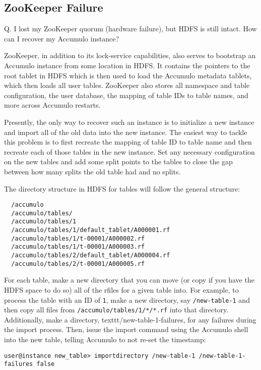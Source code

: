 \subsection{ZooKeeper Failure}
Q. I lost my ZooKeeper quorum (hardware failure), but HDFS is still intact. How can I recover my Accumulo instance?

ZooKeeper, in addition to its lock-service capabilities, also serves to bootstrap an Accumulo
instance from some location in HDFS. It contains the pointers to the root tablet in HDFS which
is then used to load the Accumulo metadata tablets, which then loads all user tables. ZooKeeper
also stores all namespace and table configuration, the user database, the mapping of table IDs to 
table names, and more across Accumulo restarts.

Presently, the only way to recover such an instance is to initialize a new instance and import all
of the old data into the new instance. The easiest way to tackle this problem is to first recreate
the mapping of table ID to table name and then recreate each of those tables in the new instance. 
Set any necessary configuration on the new tables and add some split points to the tables to close 
the gap between how many splits the old table had and no splits.

The directory structure in HDFS for tables will follow the general structure:

\small
\begin{verbatim}
  /accumulo
  /accumulo/tables/
  /accumulo/tables/1
  /accumulo/tables/1/default_tablet/A000001.rf
  /accumulo/tables/1/t-00001/A000002.rf
  /accumulo/tables/1/t-00001/A000003.rf
  /accumulo/tables/2/default_tablet/A000004.rf
  /accumulo/tables/2/t-00001/A000005.rf
\end{verbatim}
\normalsize

For each table, make a new directory that you can move (or copy if you have the HDFS space to do so)
all of the rfiles for a given table into. For example, to process the table with an ID of \texttt{1}, make a new directory, 
say \texttt{/new-table-1} and then copy all files from \texttt{/accumulo/tables/1/*/*.rf} into that directory. Additionally,
make a directory, texttt{/new-table-1-failures}, for any failures during the import process. Then, issue the import
command using the Accumulo shell into the new table, telling Accumulo to not re-set the timestamp:

\small
\begin{verbatim}
user@instance new_table> importdirectory /new-table-1 /new-table-1-failures false
\end{verbatim}
\normalsize

